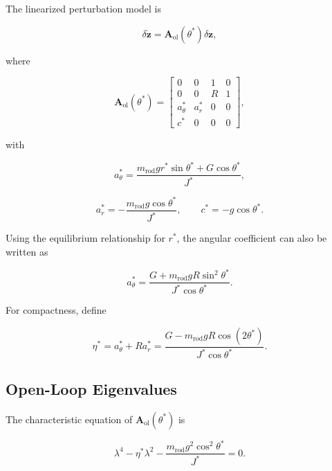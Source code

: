 The linearized perturbation model is

\begin{equation}
\delta\dot{\mathbf{z}}
=
\mathbf{A}_{\mathrm{ol}}(\theta^{*})
\delta\mathbf{z},
\end{equation}

where

\begin{equation}
\mathbf{A}_{\mathrm{ol}}(\theta^{*})
=
\begin{bmatrix}
0 & 0 & 1 & 0 \\
0 & 0 & R & 1 \\
a_{\theta}^{*} & a_r^{*} & 0 & 0 \\
c^{*} & 0 & 0 & 0
\end{bmatrix},
\label{eq:open-loop-equilibrium-matrix}
\end{equation}

with

\begin{equation}
a_{\theta}^{*}
=
\frac{
m_{\mathrm{rod}}gr^{*}\sin\theta^{*}
+
G\cos\theta^{*}
}
{J^{*}},
\end{equation}

\begin{equation}
a_r^{*}
=
-\frac{
m_{\mathrm{rod}}g\cos\theta^{*}
}
{J^{*}},
\qquad
c^{*}
=
-g\cos\theta^{*}.
\end{equation}

Using the equilibrium relationship for $r^{*}$, the angular coefficient can also be written as

\begin{equation}
a_{\theta}^{*}
=
\frac{
G+m_{\mathrm{rod}}gR\sin^2\theta^{*}
}
{J^{*}\cos\theta^{*}}.
\end{equation}

For compactness, define

\begin{equation}
\eta^{*}
=
a_{\theta}^{*}+Ra_r^{*}
=
\frac{
G-m_{\mathrm{rod}}gR\cos(2\theta^{*})
}
{J^{*}\cos\theta^{*}}.
\label{eq:open-loop-eta}
\end{equation}

\subsection{Open-Loop Eigenvalues}

The characteristic equation of
$\mathbf{A}_{\mathrm{ol}}(\theta^{*})$ is

\begin{equation}
\lambda^4
-
\eta^{*}\lambda^2
-
\frac{
m_{\mathrm{rod}}g^2\cos^2\theta^{*}
}
{J^{*}}
=
0.
\label{eq:open-loop-characteristic-general}
\end{equation}

